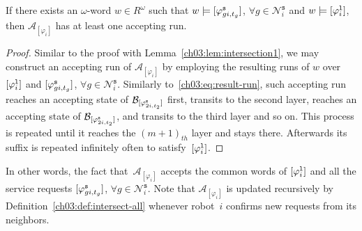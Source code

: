 \begin{lemma} \label{ch03:lem:intersection2}
If there exists an $\omega$-word $w\in R^\omega$ such that $w\models [\varphi_{gi,t_g}^{\textup{\texttt{s}}}]$, $\forall g\in \mathcal{N}_i^\texttt{s}$ and $w\models [\varphi_i^{\textup{\texttt{l}}}]$, then ${\mathcal{A}}_{[\varphi_i]}$ has at least one accepting run.
\end{lemma}
\begin{proof}
Similar to the proof with Lemma~\ref{ch03:lem:intersection1}, we may construct an accepting run of ${\mathcal{A}}_{[\varphi_i]}$ by employing the resulting runs of $w$ over $[\varphi_i^{\textup{\texttt{l}}}]$ and $[\varphi_{gi,t_g}^{\textup{\texttt{s}}}]$, $\forall g\in \mathcal{N}_i^\texttt{s}$.
Similarly to~\eqref{ch03:eq:result-run}, such accepting run reaches an accepting state of $\mathcal{B}_{[\varphi_{2i,t_2}^{\textup{\texttt{s}}}]}$ first, transits to the second layer, reaches an accepting state of $\mathcal{B}_{[\varphi_{2i,t_2}^{\textup{\texttt{s}}}]}$, and transits to the third layer and so on. This process is repeated until it reaches the $(m+1)_{th}$ layer and stays there. Afterwards its suffix is repeated infinitely often to satisfy~$[\varphi_i^{\textup{\texttt{l}}}]$.
\end{proof}

In other words, the fact that~${\mathcal{A}}_{[\varphi_i]}$ accepts the common words of ${[\varphi_i^{\textup{\texttt{l}}}]}$ and all the service requests  $[\varphi_{gi,t_g}^{\textup{\texttt{s}}}]$, $\forall g\in \mathcal{N}_i^\texttt{s}$.
Note that ${\mathcal{A}}_{[\varphi_i]}$ is updated recursively by Definition~\ref{ch03:def:intersect-all} whenever robot~$i$ confirms new requests from its neighbors.


